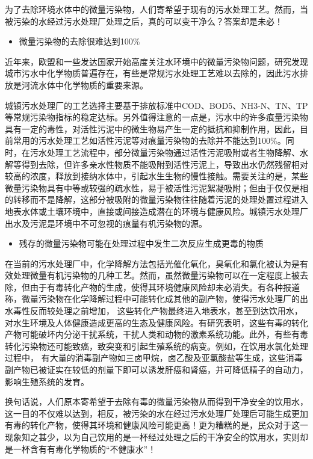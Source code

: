 \documentclass[]{book}
\providecommand{\tightlist}{%
  \setlength{\itemsep}{0pt}\setlength{\parskip}{0pt}}
\begin{document}
为了去除环境水体中的微量污染物，人们寄希望于现有的污水处理工艺。然而，当被污染的水经过污水处理厂处理之后，真的可以变干净么？答案却是未必！

\begin{itemize}
\tightlist
\item
  微量污染物的去除很难达到100\%
\end{itemize}

近年来，欧盟和一些发达国家开始高度关注水环境中的微量污染物问题，研究发现城市污水中化学物质普遍存在，有些是常规污水处理工艺难以去除的，因此污水排放是河流水体中化学物质的重要来源。

城镇污水处理厂的工艺选择主要基于排放标准中COD、BOD5、NH3-N、TN、TP等常规污染物指标的稳定达标。另外值得注意的一点是，污水中的许多痕量污染物具有一定的毒性，对活性污泥中的微生物易产生一定的抵抗和抑制作用，因此，目前常用的污水处理工艺如活性污泥等对痕量污染物的去除并不能达到100\%。同时，在污水处理工艺流程中，部分微量污染物通过活性污泥吸附或者生物降解、水解等得到去除，但许多亲水性物质不能吸附到活性污泥上，导致出水仍然残留相对较高的浓度，释放到接纳水体中，引起水生生物的慢性接触。需要关注的是，某些微量污染物具有中等或较强的疏水性，易于被活性污泥絮凝吸附；但由于仅仅是相的转移而不是降解，这部分被吸附的微量污染物往往随着污泥的处理处置过程进入地表水体或土壤环境中，直接或间接造成潜在的环境与健康风险。城镇污水处理厂出水及污泥是环境中不可忽视的痕量有机污染物的源。

\begin{itemize}
\tightlist
\item
  残存的微量污染物可能在处理过程中发生二次反应生成更毒的物质
\end{itemize}

在当前的污水处理厂中，化学降解方法包括光催化氧化，臭氧化和氯化被认为是有效处理微量有机污染物的几种工艺。然而，虽然微量污染物可以在一定程度上被去除，但由于有毒转化产物的生成，使得其环境健康风险却未必消失。有各种报道称，微量污染物在化学降解过程中可能转化成其他的副产物，使得污水处理厂的出水毒性反而较处理之前增加， 这些转化产物最终进入地表水，甚至到达饮用水，对水生环境及人体健康造成更高的生态及健康风险。有研究表明，这些有毒的转化产物可能破坏内分泌干扰系统，干扰人类和动物的激素系统功能。此外，有些有毒转化污染物还可能致癌，致突变和引起生殖系统的病变。例如，在饮用水氯化处理过程中， 有大量的消毒副产物如三卤甲烷，卤乙酸及亚氯酸盐等生成，这些消毒副产物已被证实在较低的剂量下即可以诱发肝癌和肾癌，并可降低精子的自动力，影响生殖系统的发育。

换句话说，人们原本寄希望于去除有毒的微量污染物从而得到干净安全的饮用水，这一目的不仅难以达到，相反，被污染的水在经过污水处理厂处理后可能生成更加有毒的转化产物，使得其环境和健康风险可能更高！更为糟糕的是，民众对于这一现象知之甚少，以为自己饮用的是一杯经过处理之后的干净安全的饮用水，实则却是一杯含有有毒化学物质的``不健康水''！
\end{document}
